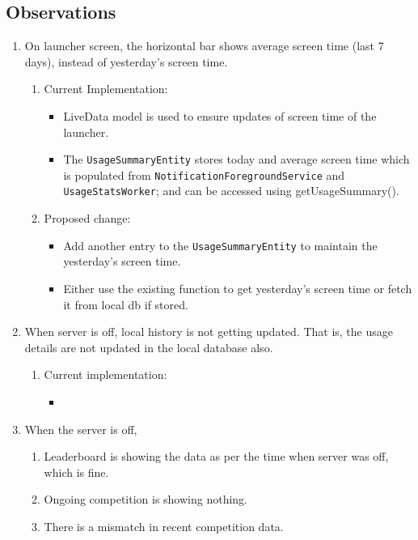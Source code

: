 \documentclass{article}
\begin{document}
\subsection{Observations}
\begin{enumerate}
    \item On launcher screen, the horizontal bar shows average screen time (last 7 days), instead of yesterday's screen time.
    \begin{enumerate}
        \item Current Implementation:
        \begin{itemize}
            \item LiveData model is used to ensure updates of screen time of the launcher.
            \item The \texttt{UsageSummaryEntity} stores today and average screen time which is populated from \texttt{NotificationForegroundService} and \texttt{UsageStatsWorker}; and can be accessed using getUsageSummary().
        \end{itemize}
        \item Proposed change:
        \begin{itemize}
            \item Add another entry to the \texttt{UsageSummaryEntity} to maintain the yesterday's screen time.
            \item Either use the existing function to get yesterday's screen time or fetch it from local db if stored.
        \end{itemize}
    \end{enumerate}
    \item When server is off, local history is not getting updated. That is, the usage details are not updated in the local database also.
    \begin{enumerate}
        \item Current implementation:
        \begin{itemize}
            \item 
        \end{itemize}
    \end{enumerate}
    \item When the server is off,
    \begin{enumerate}
        \item Leaderboard is showing the data as per the time when server was off, which is fine.
        \item Ongoing competition is showing nothing.
        \item There is a mismatch in recent competition data.
    \end{enumerate}
\end{enumerate}
\end{document}
